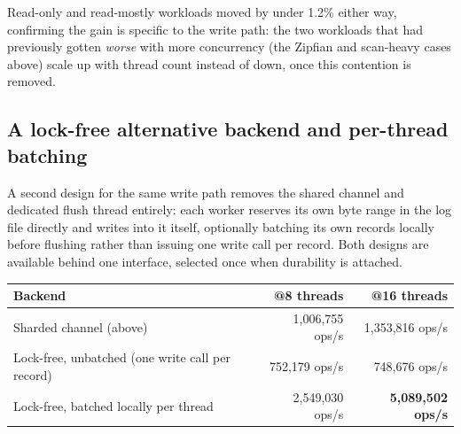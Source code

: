 \documentclass[11pt]{article}
\begin{document}
Read-only and read-mostly workloads moved by under 1.2\% either way, confirming the
gain is specific to the write path: the two workloads that had previously gotten
\emph{worse} with more concurrency (the Zipfian and scan-heavy cases above) scale up
with thread count instead of down, once this contention is removed.

\subsection{A lock-free alternative backend and per-thread batching}

A second design for the same write path removes the shared channel and dedicated
flush thread entirely: each worker reserves its own byte range in the log file
directly and writes into it itself, optionally batching its own records locally
before flushing rather than issuing one write call per record. Both designs are
available behind one interface, selected once when durability is attached.

\begin{center}
\begin{tabular}{lrr}
\toprule
Backend & @8 threads & @16 threads \\
\midrule
Sharded channel (above) & 1,006,755 ops/s & 1,353,816 ops/s \\
Lock-free, unbatched (one write call per record) & 752,179 ops/s & 748,676 ops/s \\
Lock-free, batched locally per thread & 2,549,030 ops/s & \textbf{5,089,502 ops/s} \\
\bottomrule
\end{tabular}
\end{center}
\end{document}
